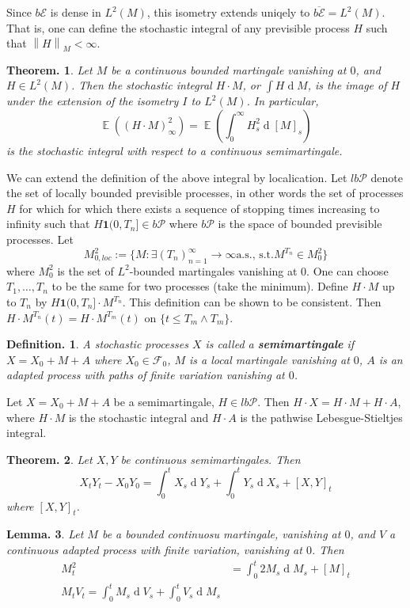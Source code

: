 \documentclass[11pt, a4paper]{memoir}
\newcommand{\norm}[1]{\ensuremath{\left\lVert#1\right\rVert}}
\theoremstyle{change}
\newtheorem{theorem}{Theorem.}[section]
\newtheorem{lemma}[theorem]{Lemma.}
\theoremstyle{plain}
\theoremstyle{nonumberplain}
\newtheorem{definition}{Definition.}
\DeclareMathOperator{\E}{{\mathbb{E}}}
\renewcommand{\d}[1]{\ensuremath{\operatorname{d}\!{#1}}}
\newcommand{\defn}[1]{{\boldmath\bfseries #1}}
\newcommand{\idc}{\mathbf{1}}
\numberwithin{equation}{section}
\begin{document}
Since $b\mathcal{E}$ is dense in $L^2(M)$, this isometry extends uniqely to $\overline{b\mathcal{E}}=L^2(M)$.
That is, one can define the stochastic integral of any previsible process $H$ such that $\norm{H}_M<\infty$.
\begin{theorem}
    Let $M$ be a continuous bounded martingale vanishing at $0$, and $H\in L^2(M)$.
    Then the stochastic integral $H\cdot M$, or $\int H\d{M}$, is the image of $H$ under the extension of the isometry $I$ to $L^2(M)$.
    In particular,
    \begin{equation*}
        \E((H\cdot M)_\infty^2)=\E(\int_0^\infty H_s^2\d{[M]_s})
    \end{equation*}
    is the stochastic integral with respect to a continuous semimartingale.
\end{theorem}
We can extend the definition of the above integral by localication.
Let $lb\mathcal{P}$ denote the set of locally bounded previsible processes, in other words the set of processes $H$ for which for which there exists a sequence of stopping times increasing to infinity such that $H\idc{(0,T_n]}\in b\mathcal{P}$ where $b\mathcal{P}$ is the space of bounded previsible processes.
Let
\begin{equation*}
    M^2_{0,loc}:=\{M:\exists(T_n)_{n=1}^\infty\to\infty\text{a.s., s.t.} M^{T_n}\in M_0^2\}
\end{equation*}
where $M_0^2$ is the set of $L^2$-bounded martingales vanishing at $0$.
One can choose $T_1,\ldots,T_n$ to be the same for two processes (take the minimum).
Define $H\cdot M$ up to $T_n$ by $H\idc{(0,T_n]}\cdot M^{T_n}$.
This definition can be shown to be consistent.
Then $H\cdot M^{T_n}(t)=H\cdot M^{T_m}(t)$ on $\{t\leq T_m\wedge T_m\}$.
\begin{definition}
    A stochastic processes $X$ is called a \defn{semimartingale} if $X=X_0+M+A$ where $X_0\in\mathcal{F}_0$, $M$ is a local martingale vanishing at $0$, $A$ is an adapted process with paths of finite variation vanishing at $0$.
\end{definition}
Let $X=X_0+M+A$ be a semimartingale, $H\in lb\mathcal{P}$.
Then $H\cdot X=H\cdot M+H\cdot A$, where $H\cdot M$ is the stochastic integral and $H\cdot A$ is the pathwise Lebesgue-Stieltjes integral.
\begin{theorem}
    Let $X,Y$ be continuous semimartingales.
    Then
    \begin{equation*}
        X_tY_t-X_0Y_0=\int_0^tX_s\d{Y_s}+\int_0^t Y_s\d{X_s}+[X,Y]_t
    \end{equation*}
    where $[X,Y]_t$.
\end{theorem}
\begin{lemma}
    Let $M$ be a bounded continuosu martingale, vanishing at $0$, and $V$ a continuous adapted process with finite variation, vanishing at $0$.
    Then
    \begin{align*}
        M_t^2 &= \int_0^t2M_s\d{M_s}+[M]_t\\
        M_tV_t=\int_0^tM_s\d{V_s}+\int_0^tV_s\d{M_s}
    \end{align*}
\end{lemma}
\end{document}
